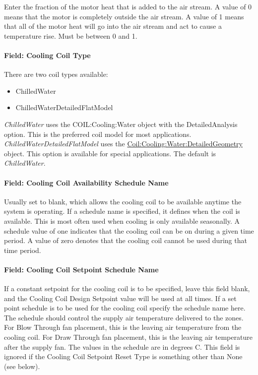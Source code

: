 Enter the fraction of the motor heat that is added to the air stream. A value of 0 means that the motor is completely outside the air stream. A value of 1 means that all of the motor heat will go into the air stream and act to cause a temperature rise. Must be between 0 and 1.

\paragraph{Field: Cooling Coil Type}\label{field-cooling-coil-type-8}

There are two coil types available:

\begin{itemize}
\item
  ChilledWater
\item
  ChilledWaterDetailedFlatModel
\end{itemize}

\emph{ChilledWater} uses the COIL:Cooling:Water object with the DetailedAnalysis option. This is the preferred coil model for most applications. \emph{ChilledWaterDetailedFlatModel} uses the \hyperref[coilcoolingwaterdetailedgeometry]{Coil:Cooling:Water:DetailedGeometry} object. This option is available for special applications. The default is \emph{ChilledWater}.

\paragraph{Field: Cooling Coil Availability Schedule Name}\label{field-cooling-coil-availability-schedule-name-7}

Usually set to blank, which allows the cooling coil to be available anytime the system is operating. If a schedule name is specified, it defines when the coil is available. This is most often used when cooling is only available seasonally. A schedule value of one indicates that the cooling coil can be on during a given time period. A value of zero denotes that the cooling coil cannot be used during that time period.

\paragraph{Field: Cooling Coil Setpoint Schedule Name}\label{field-cooling-coil-setpoint-schedule-name}

If a constant setpoint for the cooling coil is to be specified, leave this field blank, and the Cooling Coil Design Setpoint value will be used at all times. If a set point schedule is to be used for the cooling coil specify the schedule name here. The schedule should control the supply air temperature delivered to the zones. For Blow Through fan placement, this is the leaving air temperature from the cooling coil. For Draw Through fan placement, this is the leaving air temperature after the supply fan. The values in the schedule are in degrees C. This field is ignored if the Cooling Coil Setpoint Reset Type is something other than None (see below).

